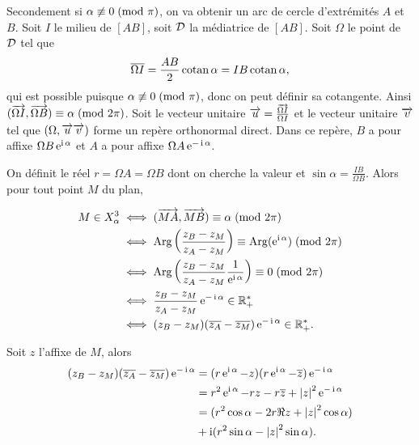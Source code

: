 Secondement si  \(\alpha \not\equiv 0\!\pmod {\pi}\), on va obtenir un arc de cercle 
d'extrémités \(A\) et \(B\). Soit \(I\) le milieu de \([AB]\), soit \(\mathcal{D}\) la 
médiatrice de \([AB]\). Soit \(\Omega\) le point de \(\mathcal{D}\) tel que
\begin{equation}
  \overline{\Omega I} = \frac{AB}{2}\operatorname{cotan} \alpha = IB \operatorname{cotan} \alpha,
\end{equation}
qui est possible puisque \(\alpha \not\equiv 0\!\pmod {\pi}\), donc on peut définir 
sa cotangente. Ainsi \((\overrightarrow{\Omega I},\overrightarrow{\Omega 
B}) \equiv \alpha\!\pmod {2\pi}\).  Soit le vecteur unitaire \(\overrightarrow{u} = \frac{\overrightarrow{\Omega 
I}}{\Omega I}\) et le vecteur unitaire \(\overrightarrow{v}\) tel que \((\Omega, \overrightarrow{u} \overrightarrow{v})\) 
forme un repère orthonormal direct. Dans ce repère, \(B\) a pour affixe 
\(\Omega B \operatorname{e}^{\operatorname{i} \alpha}\) et \(A\) a pour affixe \(\Omega A \operatorname{e}^{-\operatorname{i} 
\alpha}\).

On définit le réel \(r = \Omega A = \Omega B\) dont on cherche la valeur et 
\(\sin \alpha = \frac{IB}{\Omega B}\). Alors pour tout point \(M\) du plan,

\begin{align}
  M \in X_{\alpha}^3 & \iff (\overrightarrow{MA},\overrightarrow{MB}) \equiv \alpha\!\pmod {2\pi} \\
                     & \iff \operatorname{Arg}\left(\frac{z_B - z_M}{z_A - 
                     z_M}\right) \equiv \operatorname{Arg}(\operatorname{e}^{\operatorname{i} \alpha})\!\pmod {2\pi}\\
                     & \iff \operatorname{Arg}\left(\frac{z_B - z_M}{z_A - z_M} 
                     \frac{1}{\operatorname{e}^{\operatorname{i} \alpha}}\right) \equiv 0\!\pmod {2\pi}\\
                     & \iff \frac{z_B - z_M}{z_A - z_M} \operatorname{e}^{-\operatorname{i} \alpha} \in 
                     \mathbb{R}_{+}^{*}\\
                     & \iff (z_B - z_M)(\overline{z_A}-\overline{z_M})\operatorname{e}^{-\operatorname{i} \alpha} 
                     \in \mathbb{R}_{+}^{*}.
\end{align}

Soit \(z\) l'affixe de \(M\), alors
\begin{align}
  (z_B - z_M)(\overline{z_A}-\overline{z_M})\operatorname{e}^{-\operatorname{i} \alpha} & = (r\operatorname{e}^{\operatorname{i} \alpha} - 
  z)(r\operatorname{e}^{\operatorname{i} \alpha} - \overline{z})\operatorname{e}^{-\operatorname{i} \alpha} \\
                                                   & = r^2 \operatorname{e}^{\operatorname{i} \alpha} - 
                                                   rz - r\overline{z} + 
                                                   \left\lvert z\right\rvert^2\operatorname{e}^{-\operatorname{i} \alpha} 
                                                   \\
                                                   & = (r^2\cos \alpha - 
  2r\Re{z} + \left\lvert z\right\rvert^2\cos \alpha) \\ &+ \operatorname{i}(r^2\sin \alpha - \left\lvert z\right\rvert^2\sin 
  \alpha).
\end{align}

